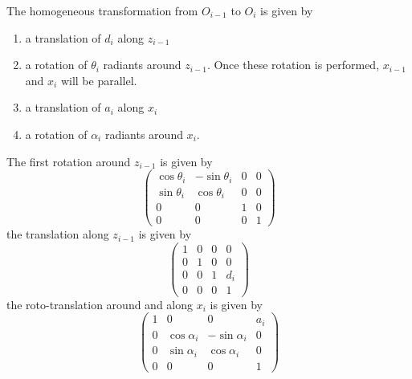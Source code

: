 \documentclass[10pt, letterpaper]{report}
\begin{document}
\noindent The homogeneous transformation from $O_{i-1}$ to $O_i$ is given by\begin{enumerate}
    \item a translation of $d_i$ along $z_{i-1}$
    \item a rotation of $\theta_i$ radiants around $z_{i-1}$. Once these rotation is performed, $x_{i-1}$ and $x_i$ will be parallel. 
    \item a translation of $a_i$ along $x_i$ 
    \item a rotation of $\alpha_i$ radiants around $x_{i}$.
\end{enumerate}
The first rotation around $z_{i-1}$ is given by\begin{equation}
    \begin{pmatrix}
        \cos\theta_i&-\sin\theta_i&0&0\\ 
        \sin\theta_i&\cos\theta_i&0&0\\ 
        0&0&1&0\\ 
        0&0&0&1
    \end{pmatrix}
\end{equation}
the translation along $z_{i-1}$ is given by \begin{equation}
    \begin{pmatrix}
        1&0&0&0\\ 
        0&1&0&0\\ 
        0&0&1&d_i\\ 
        0&0&0&1
    \end{pmatrix}
\end{equation}
the roto-translation around and along $x_i$ is given by\begin{equation}
    \begin{pmatrix}
       1&0&0&a_i\\ 
       0&\cos\alpha_i&-\sin\alpha_i&0\\ 
        0&\sin\alpha_i&\cos\alpha_i&0\\ 
        0&0&0&1
    \end{pmatrix}
\end{equation}
\end{document}
